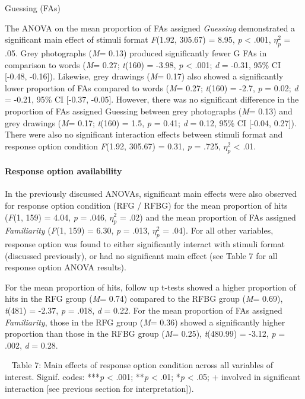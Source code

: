 \documentclass[
  11pt,
]{article}
\begin{document}
Guessing (FAs)

The ANOVA on the mean proportion of FAs assigned \emph{Guessing}
demonstrated a significant main effect of stimuli format \emph{F}(1.92,
305.67) = 8.95, \emph{p} \textless{} .001, \(\eta^2_p\) = .05. Grey
photographs (\emph{M}= 0.13) produced significantly fewer G FAs in
comparison to words (\emph{M}= 0.27; \emph{t}(160) = -3.98, \emph{p}
\textless{} .001; \emph{d} = -0.31, 95\% CI {[}-0.48, -0.16{]}).
Likewise, grey drawings (\emph{M}= 0.17) also showed a significantly
lower proportion of FAs compared to words (\emph{M}= 0.27; \emph{t}(160)
= -2.7, \emph{p} = 0.02; \emph{d} = -0.21, 95\% CI {[}-0.37, -0.05{]}.
However, there was no significant difference in the proportion of FAs
assigned Guessing between grey photographs (\emph{M}= 0.13) and grey
drawings (\emph{M}= 0.17; \emph{t}(160) = 1.5, \emph{p} = 0.41; \emph{d}
= 0.12, 95\% CI {[}-0.04, 0.27{]}). There were also no significant
interaction effects between stimuli format and response option condition
\emph{F}(1.92, 305.67) = 0.31, \emph{p} = .725, \(\eta^2_p\) \textless{}
.01.

\hypertarget{response-option-availability}{%
\paragraph{Response option
availability}\label{response-option-availability}}

In the previously discussed ANOVAs, significant main effects were also
observed for response option condition (RFG / RFBG) for the mean
proportion of hits (\emph{F}(1, 159) = 4.04, \emph{p} = .046,
\(\eta^2_p\) = .02) and the mean proportion of FAs assigned
\emph{Familiarity} (\emph{F}(1, 159) = 6.30, \emph{p} = .013,
\(\eta^2_p\) = .04). For all other variables, response option was found
to either significantly interact with stimuli format (discussed
previously), or had no significant main effect (see Table 7 for all
response option ANOVA results).

For the mean proportion of hits, follow up t-tests showed a higher
proportion of hits in the RFG group (\emph{M}= 0.74) compared to the
RFBG group (\emph{M}= 0.69), \emph{t}(481) = -2.37, \emph{p} = .018,
\emph{d} = 0.22. For the mean proportion of FAs assigned
\emph{Familiarity}, those in the RFG group (\emph{M}= 0.36) showed a
significantly higher proportion than those in the RFBG group (\emph{M}=
0.25), \emph{t}(480.99) = -3.12, \emph{p} = .002, \emph{d} = 0.28.

~ Table 7: Main effects of response option condition across all
variables of interest. Signif. codes: ***\emph{p} \textless{} .001;
**\emph{p} \textless{} .01; *\emph{p} \textless{} .05; + involved in
significant interaction {[}see previous section for interpretation{]}).
\end{document}
